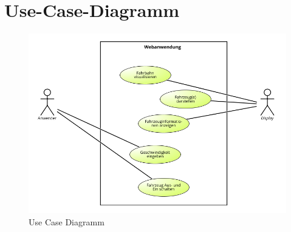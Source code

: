 \section{Use-Case-Diagramm}
\begin{figure}[h] 
\centering
\includegraphics[scale=0.8]{fig/UseCase.png} 
\caption{Use Case Diagramm}
\label{fig:UseCase}
\end{figure} 